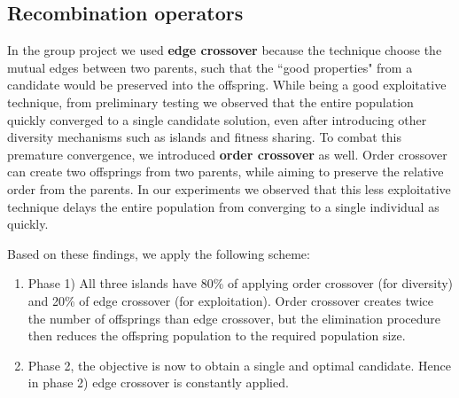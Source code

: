 \documentclass[a4paper,10pt]{article}
\newcommand{\ReplaceMe}[1]{{\color{blue}#1}}
\begin{document}
\subsection{Recombination operators}
	In the group project we used \textbf{edge crossover} because the technique choose the mutual edges between two parents, such that the ``good properties" from a candidate would be preserved into the offspring. While being a good exploitative technique, from preliminary testing we observed that the entire population quickly converged to a single candidate solution, even after introducing other diversity mechanisms such as islands and fitness sharing. To combat this premature convergence, we introduced \textbf{order crossover} as well. Order crossover can create two offsprings from two parents, while aiming to preserve the relative order from the parents. In our experiments we observed that this less exploitative technique delays the entire population from converging to a single individual as quickly.
	
	Based on these findings, we apply the following scheme:
	\begin{enumerate}
		\item Phase 1) All three islands have 80\% of applying order crossover (for diversity) and 20\% of edge crossover (for exploitation). Order crossover creates twice the number of offsprings than edge crossover, but the elimination procedure then reduces the offspring population to the required population size.
		\item Phase 2, the objective is now to obtain a single and optimal candidate. Hence in phase 2) edge crossover is constantly applied.
	\end{enumerate}


\end{document}
